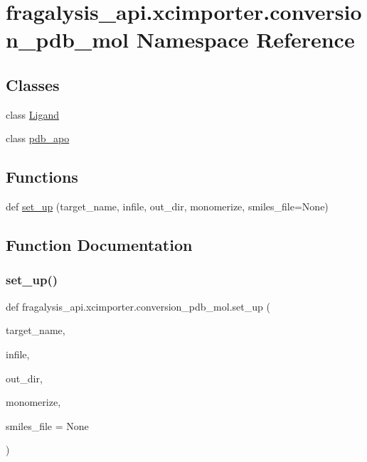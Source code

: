 \hypertarget{namespacefragalysis__api_1_1xcimporter_1_1conversion__pdb__mol}{}\section{fragalysis\+\_\+api.\+xcimporter.\+conversion\+\_\+pdb\+\_\+mol Namespace Reference}
\label{namespacefragalysis__api_1_1xcimporter_1_1conversion__pdb__mol}
\subsection*{Classes}
\begin{DoxyCompactItemize}
\item 
class \hyperlink{classfragalysis__api_1_1xcimporter_1_1conversion__pdb__mol_1_1_ligand}{Ligand}
\item 
class \hyperlink{classfragalysis__api_1_1xcimporter_1_1conversion__pdb__mol_1_1pdb__apo}{pdb\+\_\+apo}
\end{DoxyCompactItemize}
\subsection*{Functions}
\begin{DoxyCompactItemize}
\item 
def \hyperlink{namespacefragalysis__api_1_1xcimporter_1_1conversion__pdb__mol_ab8fa8ff14ff0439b99603cbbd33472e2}{set\+\_\+up} (target\+\_\+name, infile, out\+\_\+dir, monomerize, smiles\+\_\+file=None)
\end{DoxyCompactItemize}


\subsection{Function Documentation}
\mbox{\label{namespacefragalysis__api_1_1xcimporter_1_1conversion__pdb__mol_ab8fa8ff14ff0439b99603cbbd33472e2}} 
\subsubsection{\texorpdfstring{set\+\_\+up()}{set\_up()}}
{\footnotesize\ttfamily def fragalysis\+\_\+api.\+xcimporter.\+conversion\+\_\+pdb\+\_\+mol.\+set\+\_\+up (\begin{DoxyParamCaption}\item[{}]{target\+\_\+name,  }\item[{}]{infile,  }\item[{}]{out\+\_\+dir,  }\item[{}]{monomerize,  }\item[{}]{smiles\+\_\+file = {\ttfamily None} }\end{DoxyParamCaption})}

